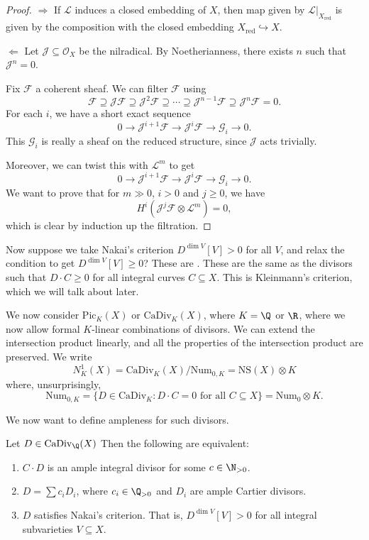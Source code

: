 \documentclass[a4paper]{article}
\newcommand\CaDiv{\mathrm{CaDiv}}
\newcommand\Pic{\mathrm{Pic}}
\newcommand\Num{\mathrm{Num}}
\newcommand\NS{\mathrm{NS}}
\DeclareMathOperator\red{red}
\begin{document}
\begin{proof}
  $\Rightarrow$ If $\mathcal{L}$ induces a closed embedding of $X$, then map given by $\mathcal{L}|_{X_{\red}}$ is given by the composition with the closed embedding $X_{\red} \hookrightarrow X$.

  $\Leftarrow$ Let $\mathcal{J} \subseteq \mathcal{O}_X$ be the nilradical. By Noetherianness, there exists $n$ such that $\mathcal{J}^n = 0$.

  Fix $\mathcal{F}$ a coherent sheaf. We can filter $\mathcal{F}$ using
  \[
    \mathcal{F} \supseteq \mathcal{J}\mathcal{F} \supseteq \mathcal{J}^2 \mathcal{F} \supseteq \cdots \supseteq \mathcal{J}^{n - 1} \mathcal{F} \supseteq \mathcal{J}^n \mathcal{F} = 0.
  \]
  For each $i$, we have a short exact sequence
  \[
    0 \to \mathcal{J}^{i + 1} \mathcal{F} \to \mathcal{J}^i \mathcal{F} \to \mathcal{G}_i \to 0.
  \]
  This $\mathcal{G}_i$ is really a sheaf on the reduced structure, since $\mathcal{J}$ acts trivially.

  Moreover, we can twist this with $\mathcal{L}^m$ to get
  \[
    0 \to \mathcal{J}^{i + 1} \mathcal{F} \to \mathcal{J}^i \mathcal{F} \to \mathcal{G}_i \to 0.
  \]
  We want to prove that for $m \gg 0$, $i > 0$ and $j \geq 0$, we have
  \[
    H^i(\mathcal{J}^j \mathcal{F} \otimes \mathcal{L}^m) = 0,
  \]
  which is clear by induction up the filtration.
\end{proof}

Now suppose we take Nakai's criterion $D^{\dim V}[V] > 0$ for all $V$, and relax the condition to get $D^{\dim V}[V] \geq 0$? These are . These are the same as the divisors such that $D \cdot C \geq 0$ for all integral curves $C \subseteq X$. This is Kleinmann's criterion, which we will talk about later.

We now consider $\Pic_K(X)$ or $\CaDiv_K(X)$, where $K = \Q$ or $\R$, where we now allow formal $K$-linear combinations of divisors. We can extend the intersection product linearly, and all the properties of the intersection product are preserved. We write
\[
  N^1_K(X) = \CaDiv_K(X) / \Num_{0, K} = \NS(X) \otimes K
\]
where, unsurprisingly,
\[
  \Num_{0, K} = \{D \in \CaDiv_K: D \cdot C = 0\text{ for all }C \subseteq X\} = \Num_0 \otimes K.
\]

We now want to define ampleness for such divisors.

\begin{prop}
  Let $D \in \CaDiv_\Q(X)$ Then the following are equivalent:
  \begin{enumerate}
    \item $C \cdot D$ is an ample integral divisor for some $c \in \N_{>0}$.
    \item $D = \sum c_i D_i$, where $c_i \in \Q_{>0}$ and $D_i$ are ample Cartier divisors.
    \item $D$ satisfies Nakai's criterion. That is, $D^{\dim V} [V] > 0$ for all integral subvarieties $V \subseteq X$.
  \end{enumerate}
\end{prop}
\end{document}

